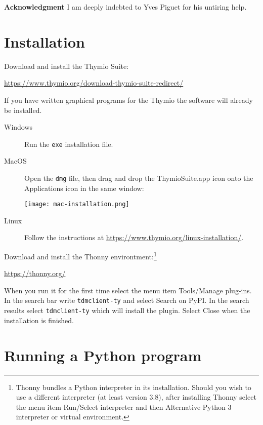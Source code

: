 \documentclass[11pt,a4paper]{article}
\newcommand*{\bu}[1]{\textsf{\small #1}}
\begin{document}
\textbf{Acknowledgment} I am deeply indebted to Yves Piguet for his untiring help.

\newpage


\section{Installation}\label{s.installation}

Download and install the Thymio Suite:
\begin{center}
\url{https://www.thymio.org/download-thymio-suite-redirect/}
\end{center}
If you have written graphical programs for the Thymio the software will already be installed.

\begin{description}
\item[Windows] Run the \texttt{exe} installation file.
\item[MacOS] Open the \texttt{dmg} file, then drag and drop the \bu{ThymioSuite.app} icon onto the Applications icon in the same window:
\begin{center}
\texttt{[image: mac-installation.png]}
\end{center}
\item[Linux] Follow the instructions at \url{https://www.thymio.org/linux-installation/}.
\end{description}

Download and install the Thonny environtment:\footnote{Thonny bundles a Python interpreter in its installation. Should you wish to use a different interpreter (at least version 3.8), after installing Thonny select the menu item  \bu{\footnotesize Run/Select interpreter} and then \bu{\footnotesize Alternative Python 3 interpreter or virtual environment}.}
\begin{center}
\url{https://thonny.org/}
\end{center}
When you run it for the first time select the menu item \bu{Tools/Manage plug-ins}. In the search bar write \verb+tdmclient-ty+ and select \bu{Search on PyPI}. In the search results select \verb+tdmclient-ty+ which will install the plugin. Select \bu{Close} when the installation is finished.


\section{Running a Python program}\label{s.running}
\end{document}
